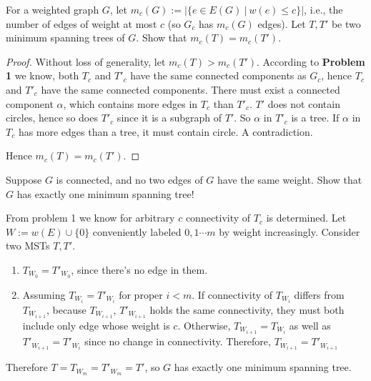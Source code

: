 \documentclass[11pt,a4paper,oneside]{article}
\begin{document}
\begin{problem}{2}
	\statement
	For a weighted graph $G$, let $m_c(G) := | \{ e \in E(G) \ | \ w(e) \leq c\}|$, i.e.,
	the number of edges of weight at most $c$ (so $G_c$ has $m_c(G)$ edges).
	Let $T, T'$ be two minimum spanning trees of $G$. Show that
	$m_c(T) = m_c(T')$.

	\solution
	\begin{proof}
	Without loss of generality, let \(m_c(T) > m_c(T')\). According to \textbf{Problem 1} we know, both \(T_c\) and \(T'_c\) have the same connected components as \(G_c\), hence \(T_c\) and \(T'_c\) have the same connected components. There must exist a connected component $\alpha$, which contains more edges in \(T_c\) than \(T'_c\). \(T'\) does not contain circles, hence so does \(T'_c\) since it is a subgraph of \(T'\). So $\alpha$ in \(T'_c\)  is a tree. If $\alpha$ in \(T_c\) has more edges than a tree, it must contain circle. A contradiction.
	
	Hence \(m_c(T) = m_c(T')\).
	\end{proof}
\end{problem}
\begin{problem}{3}
	\statement
	Suppose $G$ is connected, and no two edges of $G$ have the same weight. 
	Show that $G$ has exactly one minimum spanning tree!
	
	\solution  

	From problem 1 we know for arbitrary $c$ connectivity of $T_c$ is determined.
	Let $W := w(E) \cup \{0\}$ conveniently labeled $0, 1  \cdots m$ by weight increasingly. Consider two MSTs $T, T'$.
	\begin{enumerate}
		\item $T_{W_0} = T'_{W_0}$, since there's no edge in them.
		\item Assuming $T_{W_i} = T'_{W_i}$ for proper $i < m$. If connectivity of $T_{W_i}$ differs from $T_{W_{i + 1}}$, because $T_{W_{i+1}}$, $T'_{W_{i + 1}}$ holds the same connectivity, they must both include only edge whose weight is $c$. Otherwise, $T_{W_{i+1}} = T_{W_{i}}$ as well as $T'_{W_{i+1}} = T'_{W_{i}}$ since no change in connectivity. Therefore, $T_{W_{i + 1}} = T'_{W_{i + 1}}$
	\end{enumerate} 

	Therefore $T = T_{W_m} = T'_{W_m} = T'$, so \(G\) has exactly one minimum spanning tree.
\end{problem}
\end{document}
